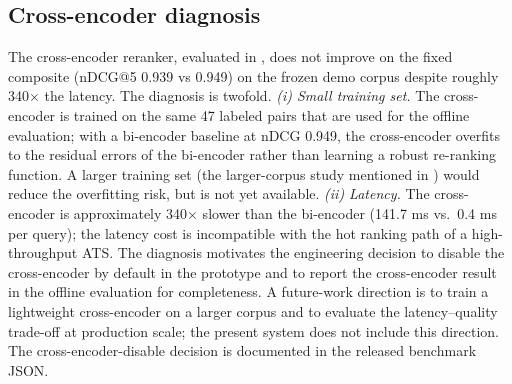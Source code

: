 \subsection{Cross-encoder diagnosis}\label{sec:3.10}
The cross-encoder reranker, evaluated in , does not improve on the fixed composite (nDCG@5 0.939 vs 0.949) on the frozen demo corpus despite roughly 340$\times$ the latency.
The diagnosis is twofold.
\emph{(i) Small training set.} The cross-encoder is trained on the same 47 labeled pairs that are used for the offline evaluation; with a bi-encoder baseline at nDCG 0.949, the cross-encoder overfits to the residual errors of the bi-encoder rather than learning a robust re-ranking function.
A larger training set (the larger-corpus study mentioned in ) would reduce the overfitting risk, but is not yet available.
\emph{(ii) Latency.} The cross-encoder is approximately 340$\times$ slower than the bi-encoder (141.7 ms vs.\ 0.4 ms per query); the latency cost is incompatible with the hot ranking path of a high-throughput ATS.
The diagnosis motivates the engineering decision to disable the cross-encoder by default in the prototype and to report the cross-encoder result in the offline evaluation for completeness.
A future-work direction is to train a lightweight cross-encoder on a larger corpus and to evaluate the latency--quality trade-off at production scale; the present system does not include this direction.
The cross-encoder-disable decision is documented in the released benchmark JSON.

